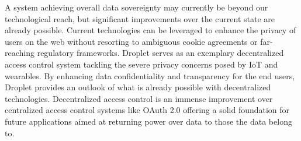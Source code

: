 \documentclass[conference]{IEEEtran}
\begin{document}
A system achieving overall data sovereignty may currently be beyond our technological reach, but significant improvements over the current state are already possible. Current technologies can be leveraged to enhance the privacy of users on the web without resorting to ambiguous cookie agreements or far-reaching regulatory frameworks.
Droplet serves as an exemplary decentralized access control system tackling the severe privacy concerns posed by IoT and wearables.
By enhancing data confidentiality and transparency for the end users, Droplet provides an outlook of what is already possible with decentralized technologies.
Decentralized access control is an immense improvement over centralized access control systems like OAuth 2.0 offering a solid foundation for future applications aimed at returning power over data to those the data belong to.



\end{document}
